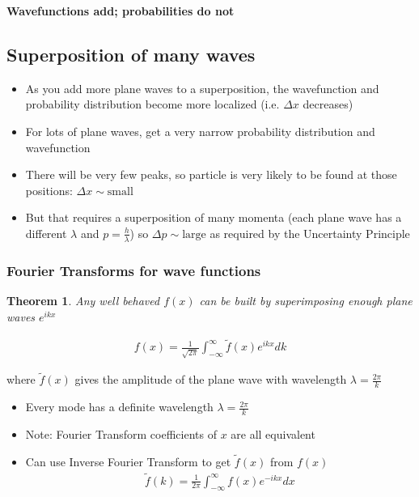 \documentclass[a4paper,12pt]{article}
\newtheorem{thm}{Theorem}
\begin{document}
\textbf{Wavefunctions add; probabilities do not}

\subsection{Superposition of many waves}
\begin{itemize}
  \item As you add more plane waves to a superposition, the wavefunction and probability distribution become more localized (i.e. $\Delta x$ decreases)
  \item For lots of plane waves, get a very narrow probability distribution and wavefunction
  \item There will be very few peaks, so particle is very likely to be found at those positions: $\Delta x \sim \text{small}$
  \item But that requires a superposition of many momenta (each plane wave has a different $\lambda$ and $p = \frac{h}{\lambda}$) so $\Delta p \sim \text{large}$ as required by the Uncertainty Principle

\end{itemize}

\subsubsection{Fourier Transforms for wave functions}
\begin{thm}
  Any well behaved $f(x)$ can be built by superimposing enough plane waves $e^{ikx}$

  \begin{align}
    f(x) = \frac{1}{\sqrt{2\pi}} \int^{\infty}_{-\infty}\widetilde{f}(x) e^{ikx} dk
  \end{align}
\end{thm}
where $\widetilde{f}(x)$ gives the amplitude of the plane wave with wavelength $\lambda = \frac{2\pi}{k}$

\begin{itemize}
  \item Every mode has a definite wavelength $\lambda = \frac{2\pi}{k}$
  \item Note: Fourier Transform coefficients of $x$ are all equivalent
  \item Can use Inverse Fourier Transform to get $\widetilde{f}(x)$ from $f(x)$
  \begin{align}
    \widetilde{f}(k) = \frac{1}{2\pi} \int^{\infty}_{-\infty}f(x) e^{-ikx} dx
  \end{align}
\end{itemize}
\end{document}
